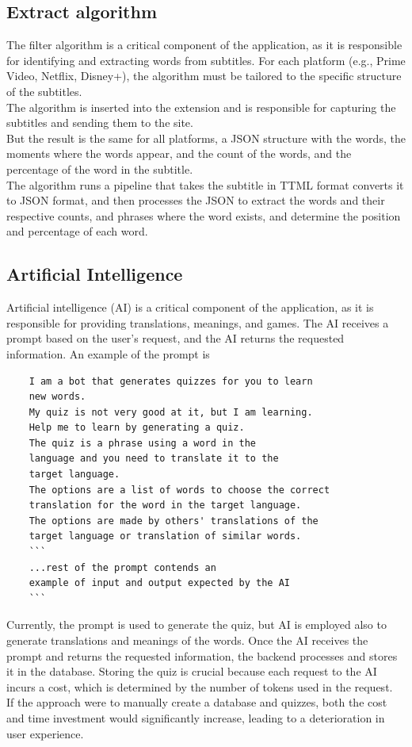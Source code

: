 \documentclass[12pt]{article}
\begin{document}
\subsection{Extract algorithm}
The filter algorithm is a critical component of the application, as it is responsible for identifying and extracting words from subtitles. For each platform (e.g., Prime Video, Netflix, Disney+), the algorithm must be tailored to the specific structure of the subtitles. \\
The algorithm is inserted into the extension and is responsible for capturing the subtitles and sending them to the site. \\
But the result is the same for all platforms, a JSON structure with the words, the moments where the words appear, and the count of the words, and the percentage of the word in the subtitle. \\
The algorithm runs a pipeline that takes the subtitle in TTML format converts it to JSON format, and then processes the JSON to extract the words and their respective counts, and phrases where the word exists, and determine the position and percentage of each word. 
\subsection{Artificial Intelligence}
  Artificial intelligence (AI) is a critical component of the application, as it is responsible for providing translations, meanings, and games. The AI receives a prompt based on the user's request, and the AI returns the requested information. 
  An example of the prompt is \\
  \begin{verbatim}
    I am a bot that generates quizzes for you to learn 
    new words. 
    My quiz is not very good at it, but I am learning.
    Help me to learn by generating a quiz.
    The quiz is a phrase using a word in the 
    language and you need to translate it to the 
    target language.
    The options are a list of words to choose the correct 
    translation for the word in the target language. 
    The options are made by others' translations of the 
    target language or translation of similar words.
    ```
    ...rest of the prompt contends an 
    example of input and output expected by the AI
    ```
  \end{verbatim}
  Currently, the prompt is used to generate the quiz, but AI is employed also to generate translations and meanings of the words. Once the AI receives the prompt and returns the requested information, the backend processes and stores it in the database. Storing the quiz is crucial because each request to the AI incurs a cost, which is determined by the number of tokens used in the request. \\
  If the approach were to manually create a database and quizzes, both the cost and time investment would significantly increase, leading to a deterioration in user experience. 
\end{document}
